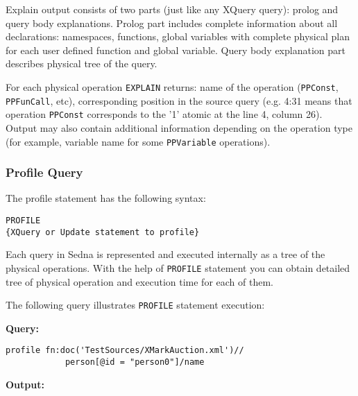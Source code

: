 \documentclass[a4paper,12pt]{article}
\begin{document}
Explain output consists of two parts (just like any XQuery query): prolog and
query body explanations. Prolog part includes complete information about all
declarations: namespaces, functions, global variables with complete physical
plan for each user defined function and global variable. Query body explanation
part describes physical tree of the query.

For each physical operation \verb!EXPLAIN! returns: name of the operation
(\verb!PPConst!, \verb!PPFunCall!, etc), corresponding position in the source
query (e.g. 4:31 means that operation \verb!PPConst! corresponds to the '1'
atomic at the line 4, column 26). Output may also contain additional information
depending on the operation type (for example, variable name for some
\verb!PPVariable! operations).


\subsubsection{Profile Query}
\label{profile}

The profile statement has the following syntax:
\begin{verbatim}
PROFILE
{XQuery or Update statement to profile}
\end{verbatim}
Each query in Sedna is represented and executed internally as a tree of the
physical operations. With the help of \verb!PROFILE! statement you can obtain
detailed tree of physical operation and execution time for each of them.

\medskip
\noindent
The following query illustrates \verb!PROFILE! statement execution:

\medskip
\noindent
\textbf{Query:}
\begin{verbatim}
profile fn:doc('TestSources/XMarkAuction.xml')//
            person[@id = "person0"]/name
\end{verbatim}
\textbf{Output:}
\end{document}
